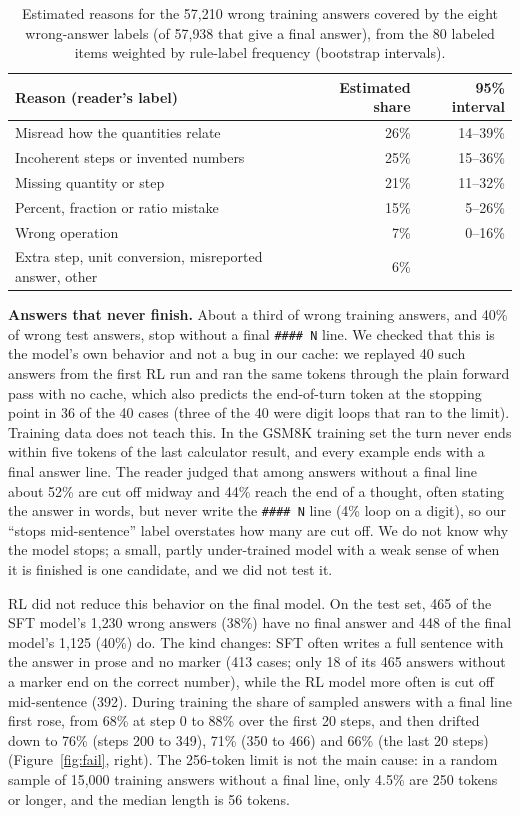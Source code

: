 \documentclass[10pt]{article}
\newcommand{\code}[1]{\texttt{#1}}
\begin{document}
\begin{table}[h]
\centering
\small
\begin{tabular}{lrr}
\toprule
Reason (reader's label) & Estimated share & 95\% interval \\
\midrule
Misread how the quantities relate & 26\% & 14--39\% \\
Incoherent steps or invented numbers & 25\% & 15--36\% \\
Missing quantity or step & 21\% & 11--32\% \\
Percent, fraction or ratio mistake & 15\% & 5--26\% \\
Wrong operation & 7\% & 0--16\% \\
Extra step, unit conversion, misreported answer, other & 6\% & \\
\bottomrule
\end{tabular}
\caption{Estimated reasons for the 57{,}210 wrong training answers covered by the eight wrong-answer labels (of 57{,}938 that give a final answer), from the 80 labeled items weighted by rule-label frequency (bootstrap intervals).}
\label{tab:reasons}
\end{table}

\textbf{Answers that never finish.} About a third of wrong training answers, and 40\% of wrong test answers, stop without a final \code{\#\#\#\# N} line. We checked that this is the model's own behavior and not a bug in our cache: we replayed 40 such answers from the first RL run and ran the same tokens through the plain forward pass with no cache, which also predicts the end-of-turn token at the stopping point in 36 of the 40 cases (three of the 40 were digit loops that ran to the limit). Training data does not teach this. In the GSM8K training set the turn never ends within five tokens of the last calculator result, and every example ends with a final answer line. The reader judged that among answers without a final line about 52\% are cut off midway and 44\% reach the end of a thought, often stating the answer in words, but never write the \code{\#\#\#\# N} line (4\% loop on a digit), so our ``stops mid-sentence'' label overstates how many are cut off. We do not know why the model stops; a small, partly under-trained model with a weak sense of when it is finished is one candidate, and we did not test it.

RL did not reduce this behavior on the final model. On the test set, 465 of the SFT model's 1{,}230 wrong answers (38\%) have no final answer and 448 of the final model's 1{,}125 (40\%) do. The kind changes: SFT often writes a full sentence with the answer in prose and no marker (413 cases; only 18 of its 465 answers without a marker end on the correct number), while the RL model more often is cut off mid-sentence (392). During training the share of sampled answers with a final line first rose, from 68\% at step 0 to 88\% over the first 20 steps, and then drifted down to 76\% (steps 200 to 349), 71\% (350 to 466) and 66\% (the last 20 steps) (Figure~\ref{fig:fail}, right). The 256-token limit is not the main cause: in a random sample of 15{,}000 training answers without a final line, only 4.5\% are 250 tokens or longer, and the median length is 56 tokens.
\end{document}
